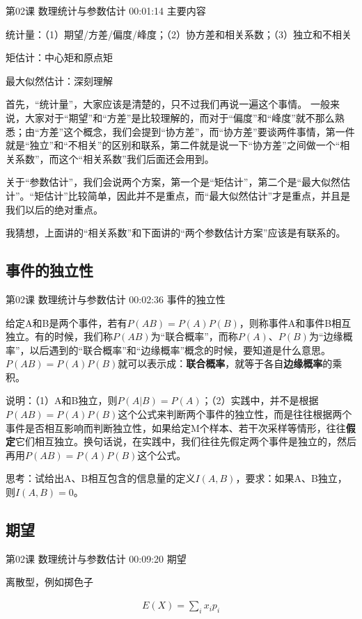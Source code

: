 \documentclass[UTF8]{ctexbook}
\begin{document}
第02课 数理统计与参数估计 00:01:14 主要内容

统计量：（1）期望/方差/偏度/峰度；（2）协方差和相关系数；（3）独立和不相关

矩估计：中心矩和原点矩

最大似然估计：深刻理解

首先，“统计量”，大家应该是清楚的，只不过我们再说一遍这个事情。 一般来说，大家对于“期望”和“方差”是比较理解的，而对于“偏度”和“峰度”就不那么熟悉；由“方差”这个概念，我们会提到“协方差”，而“协方差”要谈两件事情，第一件就是“独立”和“不相关”的区别和联系，第二件就是说一下“协方差”之间做一个“相关系数”，而这个“相关系数”我们后面还会用到。

关于“参数估计”，我们会说两个方案，第一个是“矩估计”，第二个是“最大似然估计”。“矩估计”比较简单，因此并不是重点，而“最大似然估计”才是重点，并且是我们以后的绝对重点。

我猜想，上面讲的“相关系数”和下面讲的“两个参数估计方案”应该是有联系的。

\subsection{事件的独立性}

第02课 数理统计与参数估计 00:02:36 事件的独立性

给定A和B是两个事件，若有$P(AB)=P(A)P(B)$，则称事件A和事件B相互独立。有的时候，我们称$P(AB)$为“联合概率”，而称$P(A)$、$P(B)$为“边缘概率”，以后遇到的“联合概率”和“边缘概率”概念的时候，要知道是什么意思。$P(AB)=P(A)P(B)$就可以表示成：\textbf{联合概率}，就等于各自\textbf{边缘概率}的乘积。

说明：（1）A和B独立，则$P(A|B)=P(A)$；（2）实践中，并不是根据$P(AB)=P(A)P(B)$这个公式来判断两个事件的独立性，而是往往根据两个事件是否相互影响而判断独立性，如果给定M个样本、若干次采样等情形，往往\textbf{假定}它们相互独立。换句话说，在实践中，我们往往先假定两个事件是独立的，然后再用$P(AB)=P(A)P(B)$这个公式。

思考：试给出A、B相互包含的信息量的定义$I(A,B)$，要求：如果A、B独立，则$I(A,B)=0$。

\subsection{期望}

第02课 数理统计与参数估计 00:09:20 期望

离散型，例如掷色子

\begin{equation}
\begin{aligned}
E(X)=\sum_{i}x_{i}p_{i}
\end{aligned}
\end{equation}
\end{document}
